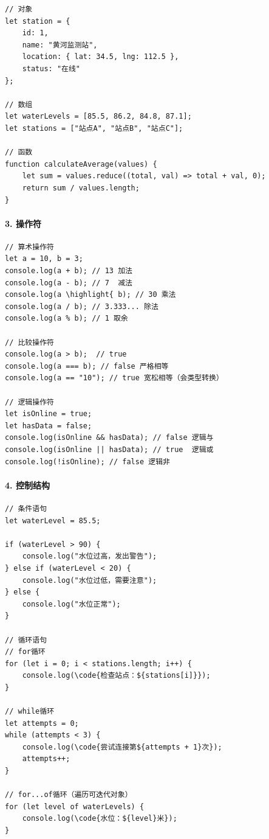 \begin{lstlisting}[style=javascript]
// 对象
let station = {
    id: 1,
    name: "黄河监测站",
    location: { lat: 34.5, lng: 112.5 },
    status: "在线"
};

// 数组
let waterLevels = [85.5, 86.2, 84.8, 87.1];
let stations = ["站点A", "站点B", "站点C"];

// 函数
function calculateAverage(values) {
    let sum = values.reduce((total, val) => total + val, 0);
    return sum / values.length;
}
\end{lstlisting}

\hypertarget{ux64cdux4f5cux7b26}{%
\paragraph{3. 操作符}\label{ux64cdux4f5cux7b26}}

\begin{lstlisting}[style=javascript]
// 算术操作符
let a = 10, b = 3;
console.log(a + b); // 13 加法
console.log(a - b); // 7  减法
console.log(a \highlight{ b); // 30 乘法
console.log(a / b); // 3.333... 除法
console.log(a % b); // 1 取余

// 比较操作符
console.log(a > b);  // true
console.log(a === b); // false 严格相等
console.log(a == "10"); // true 宽松相等（会类型转换）

// 逻辑操作符
let isOnline = true;
let hasData = false;
console.log(isOnline && hasData); // false 逻辑与
console.log(isOnline || hasData); // true  逻辑或
console.log(!isOnline); // false 逻辑非
\end{lstlisting}

\hypertarget{ux63a7ux5236ux7ed3ux6784}{%
\paragraph{4. 控制结构}\label{ux63a7ux5236ux7ed3ux6784}}

\begin{lstlisting}[style=javascript]
// 条件语句
let waterLevel = 85.5;

if (waterLevel > 90) {
    console.log("水位过高，发出警告");
} else if (waterLevel < 20) {
    console.log("水位过低，需要注意");
} else {
    console.log("水位正常");
}

// 循环语句
// for循环
for (let i = 0; i < stations.length; i++) {
    console.log(\code{检查站点：${stations[i]}});
}

// while循环
let attempts = 0;
while (attempts < 3) {
    console.log(\code{尝试连接第${attempts + 1}次});
    attempts++;
}

// for...of循环（遍历可迭代对象）
for (let level of waterLevels) {
    console.log(\code{水位：${level}米});
}
\end{lstlisting}

